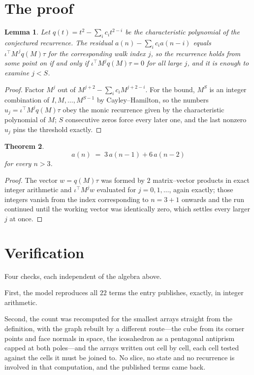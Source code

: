 \documentclass[11pt,a4paper]{article}
\theoremstyle{plain}
\newtheorem{theorem}{Theorem}
\newtheorem{lemma}[theorem]{Lemma}
\theoremstyle{definition}
\begin{document}
\section{The proof}

\begin{lemma}\label{lem:crit}
Let $q(t)=t^{2}-\sum_i c_it^{2-i}$ be the characteristic polynomial of the
conjectured recurrence. The residual $a(n)-\sum_ic_ia(n-i)$ equals
$\iota^{\!\top}M^{\,j}q(M)\tau$ for the corresponding walk index $j$, so the recurrence
holds from some point on if and only if $\iota^{\!\top}M^{j}q(M)\tau=0$ for all large $j$,
and it is enough to examine $j<S$.
\end{lemma}

\begin{proof}
Factor $M^{j}$ out of $M^{j+2}-\sum_ic_iM^{j+2-i}$. For the bound, $M^{S}$
is an integer combination of $I,M,\dots,M^{S-1}$ by Cayley--Hamilton, so the numbers
$u_j=\iota^{\!\top}M^{j}q(M)\tau$ obey the monic recurrence given by the characteristic
polynomial of $M$; $S$ consecutive zeros force every later one, and the last nonzero $u_j$
pins the threshold exactly.
\end{proof}

\begin{theorem}
\[
a(n)\;=\;3\,a(n-1) + 6\,a(n-2)
\]
for every $n>3$.
\end{theorem}

\begin{proof}
The vector $w=q(M)\tau$ was formed by $2$ matrix--vector products in exact integer
arithmetic and $\iota^{\!\top}M^{j}w$ evaluated for $j=0,1,\dots$, again exactly; those
integers vanish from the index corresponding to $n=3+1$ onwards and the run continued
until the working vector was identically zero, which settles every larger $j$ at once.
\end{proof}

\section{Verification}

Four checks, each independent of the algebra above.

First, the model reproduces all $22$ terms the entry publishes, exactly, in integer
arithmetic.

Second, the count was recomputed for the smallest arrays straight from the definition, with the
graph rebuilt by a different route---the cube from its corner points and face normals in space,
the icosahedron as a pentagonal antiprism capped at both poles---and the arrays written out cell
by cell, each cell tested against the cells it must be joined to. No slice, no state and no
recurrence is involved in that computation, and the published terms came back.
\end{document}
